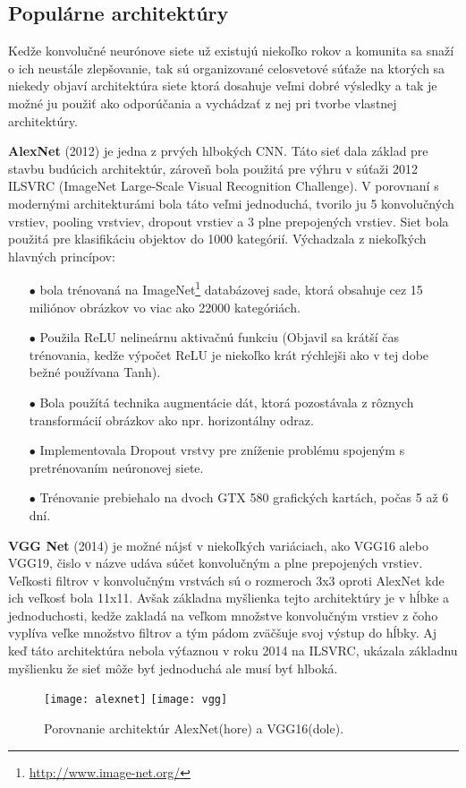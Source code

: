 \subsection{Populárne architektúry}
Kedže konvolučné neurónove siete už existujú niekoľko rokov a komunita sa snaží o ich neustále zlepšovanie, tak sú organizované
    celosvetové súťaže na ktorých sa niekedy objaví architektúra siete ktorá dosahuje veľmi dobré výsledky a tak je možné ju použiť ako odporúčania a
    vychádzať z nej pri tvorbe vlastnej architektúry.

\textbf{AlexNet} (2012) je jedna z prvých hlbokých CNN. Táto sieť dala základ pre stavbu budúcich architektúr, zároveň bola použitá
    pre výhru v súťaži 2012 ILSVRC (ImageNet Large-Scale Visual Recognition Challenge).
V porovnaní s modernými architekturámi bola táto veľmi jednoduchá, tvorilo ju 5 konvolučných vrstiev, pooling vrstviev, dropout vrstiev a 3 plne prepojených vrstiev.
Siet bola použitá pre klasifikáciu objektov do 1000 kategórií.
Výchadzala z niekoľkých hlavných princípov\cite{odkaz:PopularCNN}:
\begin{enumerate}
    \item[$\bullet$] bola trénovaná na ImageNet\footnote{\url{http://www.image-net.org/}} databázovej sade, ktorá obsahuje cez 15 miliónov obrázkov vo viac ako 22000 kategóriách.
    \item[$\bullet$] Použila ReLU nelineárnu aktivačnú funkciu (Objavil sa krátší čas trénovania, kedže výpočet ReLU je niekoľko krát rýchlejši ako v tej dobe bežné používana Tanh).
    \item[$\bullet$] Bola použítá technika augmentácie dát, ktorá pozostávala z rôznych transformácií obrázkov ako npr. horizontálny odraz.
    \item[$\bullet$] Implementovala Dropout vrstvy pre zníženie problému spojeným s pretrénovaním neúronovej siete.
    \item[$\bullet$] Trénovanie prebiehalo na dvoch GTX 580 grafických kartách, počas 5 až 6 dní.
\end{enumerate}

\textbf{VGG Net} (2014) je možné nájsť v niekoľkých variáciach, ako VGG16 alebo VGG19, čislo v názve udáva súčet konvolučným a plne prepojených vrstiev.
Veľkosti filtrov v konvolučným vrstvách sú o rozmeroch 3x3 oproti AlexNet kde ich veľkosť bola 11x11.
Avšak základna myšlienka tejto architektúry je v hĺbke a jednoduchosti, kedže zakladá na veľkom množstve konvolučným vrstiev z čoho vyplíva
    veľke množstvo filtrov a tým pádom zväčšuje svoj výstup do hĺbky.
Aj keď táto architektúra nebola výťaznou v roku 2014 na ILSVRC, ukázala základnu myšlienku že sieť môže byť jednoduchá ale musí byť hlboká\cite{odkaz:PopularCNN}.

\begin{figure}[H]
    \centering
    \texttt{[image: alexnet]}
    \qquad
    \texttt{[image: vgg]}
    \caption{Porovnanie architektúr AlexNet(hore)\cite{odkaz:AlexNet} a VGG16(dole)\cite{odkaz:VGG16}.}
    \label{pic:PopularCNN}
\end{figure}
